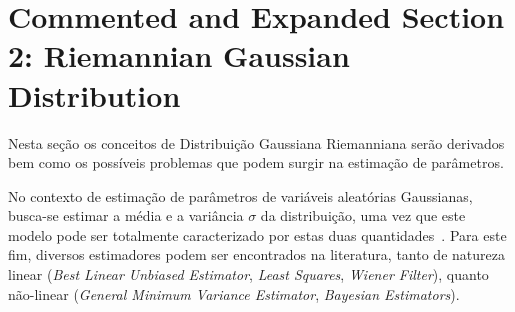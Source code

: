 \documentclass[a4paper,titlepage]{article}
\begin{document}
\section{Commented and Expanded Section 2: Riemannian Gaussian Distribution}
Nesta seção os conceitos de Distribuição Gaussiana Riemanniana serão derivados
bem como os possíveis problemas que podem surgir na estimação de parâmetros.

\begin{center}
  \vspace{1em}
  \vspace{1em}
\end{center}

No contexto de estimação de parâmetros de variáveis aleatórias Gaussianas,
busca-se estimar a média e a variância $\sigma$ da distribuição, uma vez que
este modelo pode ser totalmente caracterizado por estas duas
quantidades~\cite{kay}. Para este fim, diversos estimadores podem ser
encontrados na literatura, tanto de natureza linear (\textit{Best Linear
Unbiased Estimator}, \textit{Least Squares}, \textit{Wiener Filter}), quanto
não-linear (\textit{General Minimum Variance Estimator}, \textit{Bayesian
Estimators})\cite{kay,haykin}.
\end{document}
